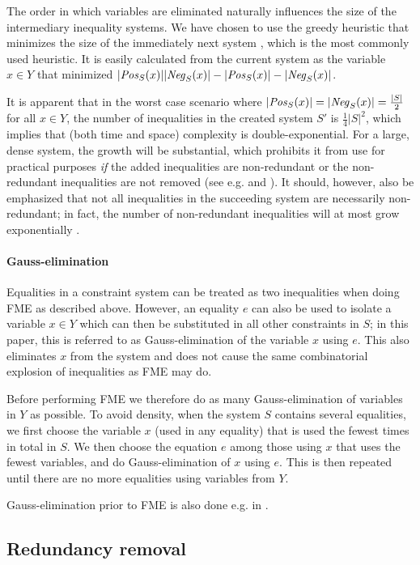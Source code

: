 The order in which variables are eliminated naturally influences the size of the intermediary inequality systems. We have chosen to use the greedy heuristic that minimizes the size of the immediately next system \cite{duffin74}, which is the most commonly used heuristic. It is easily calculated from the current system as the variable $x\in Y$ that minimized $|\mathit{Pos}_S(x)||\mathit{Neg}_S(x)| - |\mathit{Pos}_S(x)|-|\mathit{Neg}_S(x)|$. 


It is apparent that in the worst case scenario where $|\mathit{Pos}_S(x)| = |\mathit{Neg}_S(x)| = \frac{|S|}{2}$ for all $x\in Y$, the number of inequalities in the created system $S'$ is $\frac{1}{4}|S|^2$, which implies that (both time and space) complexity is double-exponential. For a large, dense system, the growth will be substantial, which prohibits it from use for practical purposes \emph{if} the added inequalities are non-redundant or the non-redundant inequalities are not removed ({see e.g. \cite{lassez93} and \cite{lukatskii08}}). It should, however, also be emphasized that not all inequalities in the succeeding system are necessarily non-redundant; in fact, the number of non-redundant inequalities will at most grow exponentially \cite{monniaux10}.

\paragraph{Gauss-elimination}
Equalities in a constraint system can be treated as two inequalities when doing FME as described above. However, an equality $e$ can also be used to isolate a variable $x\in Y$ which can then be substituted in all other constraints in $S$; in this paper, this is referred to as Gauss-elimination of the variable $x$ using $e$. This also eliminates $x$ from the system and does not cause the same combinatorial explosion of inequalities as FME may do. 

Before performing FME we therefore do as many Gauss-elimination of variables in $Y$ as possible.
%
To avoid density, when the system $S$ contains several equalities, we first choose the variable $x$ (used in any equality) that is used the fewest times in total in $S$. We then choose the equation $e$ among those using $x$ that uses the fewest variables, and do Gauss-elimination of $x$ using $e$. 
This is then repeated until there are no more equalities using variables from $Y$.

Gauss-elimination prior to FME is also done e.g. in \cite{simon05}.
 
\subsection{Redundancy removal}
